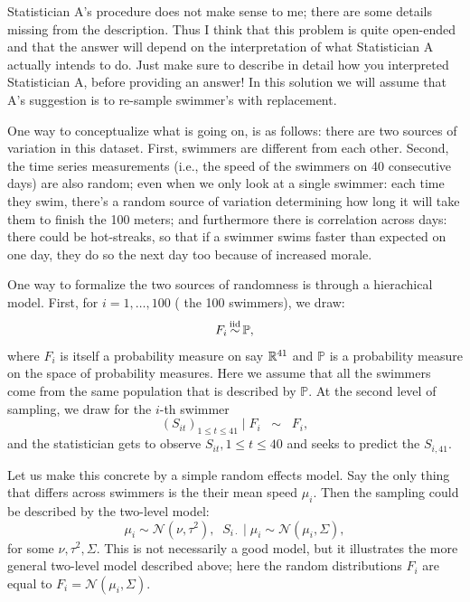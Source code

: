 Statistician A's procedure does not make sense to me; there are some details missing from the description. Thus I think that this problem is quite open-ended and that the answer will depend on the interpretation of what Statistician A actually intends to do. Just make sure to describe in detail how you interpreted Statistician A, before providing an answer! In this solution we will assume that A's suggestion is to re-sample swimmer's with replacement.

One way to conceptualize what is going on, is as follows: there are two sources of variation in this dataset. First, swimmers are different from each other. Second, the time series measurements (i.e., the speed of the swimmers on 40 consecutive days) are also random; even when we only look at a single swimmer: each time they swim, there's a random source of variation determining how long it will take them to finish the 100 meters; and furthermore there is correlation across days: there could be hot-streaks, so that if a swimmer swims faster than expected on one day, they do so the next day too because of increased morale.

One way to formalize the two sources of randomness is through a hierachical model. First, for $i=1,\dotsc,100$ ( the 100 swimmers), we draw:
\begin{equation}
\label{eq:level1}
F_i \simiid \mathbb P,
\end{equation}
where $F_i$ is itself a probability measure on say $\mathbb{R}^{41}$ and $\mathbb P$ is a probability measure on the space of probability measures. Here we assume that all the swimmers come from the same population that is described by $\mathbb P$.  At the second level of sampling, we draw for the $i$-th swimmer
\begin{equation}
\label{eq:level2}
(S_{it})_{1 \leq t \leq 41} \mid F_i\;\;  \sim \;\;F_i,
\end{equation}
and the statistician gets to observe $S_{it}, 1\leq t\leq 40$ and seeks to predict the $S_{i,41}$. 

Let us make this concrete by a simple random effects model. Say the only thing that differs across swimmers is the their mean speed $\mu_i$. Then the sampling could be described by the two-level model:
$$ \mu_i \sim \mathcal{N}(\nu, \tau^2),\;\;  S_{i\cdot} \mid \mu_i \sim \mathcal{N}(\mu_i, \Sigma),$$
for some $\nu, \tau^2, \Sigma$. This is not necessarily a good model, but it illustrates the more general two-level model described above; here the random distributions $F_i$ are equal to $F_i = \mathcal{N}(\mu_i, \Sigma)$. 


